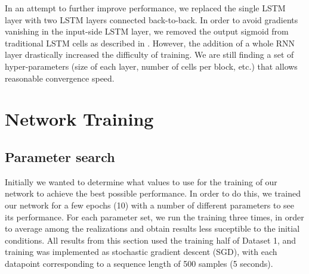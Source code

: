 \documentclass{acm_proc_article-sp}
\begin{document}
In an attempt to further improve performance, we replaced the single LSTM layer with two LSTM layers connected back-to-back. In order to avoid gradients vanishing in the input-side LSTM layer, we removed the output sigmoid from traditional LSTM cells as described in \cite{Gers2002}. However, the addition of a whole RNN layer drastically increased the difficulty of training. We are still finding a set of hyper-parameters (size of each layer, number of cells per block, etc.) that allows reasonable convergence speed.

\section{Network Training}
\label{sec:Network Training}

\subsection{Parameter search}
Initially we wanted to determine what values to use for the training of our network to achieve the best possible performance. In order to do this, we trained our network for a few epochs (10) with a  number of different parameters to see its performance.
For each parameter set, we run the training three times, in order to average among the realizations and obtain results less suceptible to the initial conditions.
All results from this section used the training half of Dataset 1, and training was implemented as stochastic gradient descent (SGD), with each datapoint corresponding to a sequence length of 500 samples (5 seconds).
\end{document}
